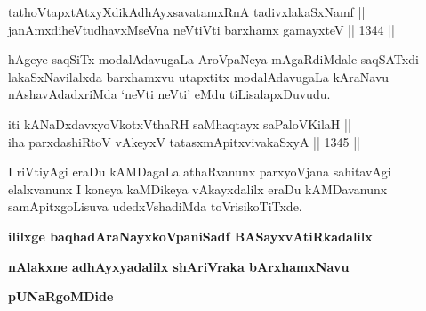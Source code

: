 \begin{shl}
tathoVtapxtAtxyXdikAdhAyxsavatamxRnA tadivxlakaSxNamf || \\
janAmxdiheVtudhavxMseVna neVtiVti barxhamx gamayxteV \hfill || 1344 ||  
\end{shl}

\begin{artha}
hAgeye saqSiTx modalAdavugaLa AroVpaNeya mAgaRdiMdale saqSATxdi lakaSxNavilalxda barxhamxvu utapxtitx modalAdavugaLa kAraNavu nAshavAdadxriMda `neVti neVti' eMdu tiLisalapxDuvudu.
\end{artha}


\begin{shl}
iti kANaDxdavxyoVkotxV\s thaRH saMhaqtayx saPaloV\s KilaH || \\
iha parxdashiRtoV vAkeyxV tatasxmApitxvivakaSxyA \hfill || 1345 ||  
\end{shl}

\begin{artha}
I riVtiyAgi eraDu kAMDagaLa athaRvanunx parxyoVjana sahitavAgi elalxvanunx I koneya kaMDikeya vAkayxdalilx eraDu kAMDavanunx samApitxgoLisuva udedxVshadiMda toVrisikoTiTxde.
\end{artha}




\begin{center}
{\bf ililxge baqhadAraNayxkoVpaniSadf BASayxvAtiRkadalilx}
\smallskip

{\bf nAlakxne adhAyxyadalilx shAriVraka bArxhamxNavu}
\smallskip

{\bf pUNaRgoMDide}
\end{center}
